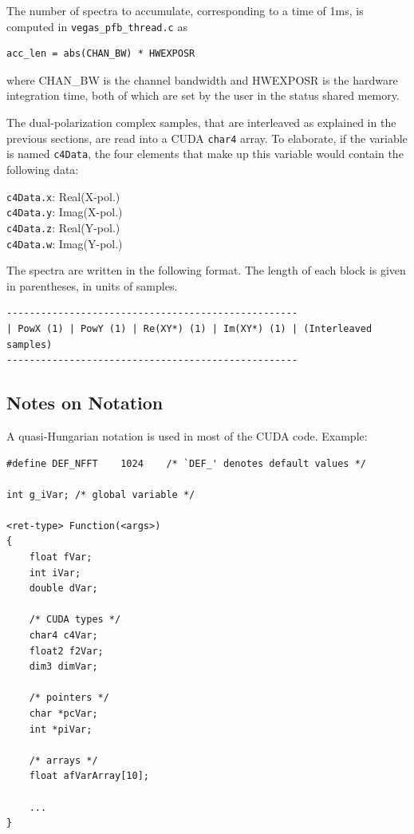 \documentclass[11pt]{article} %
\begin{document}
The number of spectra to accumulate, corresponding to a time of 1ms, is
computed in {\tt vegas\_pfb\_thread.c} as
\begin{verbatim}
acc_len = abs(CHAN_BW) * HWEXPOSR
\end{verbatim}
where CHAN\_BW is the channel bandwidth and HWEXPOSR is the hardware
integration time, both of which are set by the user in the status shared memory.

The dual-polarization complex samples, that are interleaved as explained in the
previous sections, are read into a CUDA {\tt char4} array. To elaborate, if the
variable is named {\tt c4Data}, the four elements that make up this variable
would contain the following data:

\vspace{11pt}

\noindent
{\tt c4Data.x}: Real(X-pol.)\\
{\tt c4Data.y}: Imag(X-pol.)\\
{\tt c4Data.z}: Real(Y-pol.)\\
{\tt c4Data.w}: Imag(Y-pol.)

\vspace{11pt}

The spectra are written in the following format. The length of each block is
given in parentheses, in units of samples.
\begin{verbatim}
---------------------------------------------------
| PowX (1) | PowY (1) | Re(XY*) (1) | Im(XY*) (1) | (Interleaved samples)
---------------------------------------------------
\end{verbatim}


\subsection{Notes on Notation}

A quasi-Hungarian notation is used in most of the CUDA code. Example:

\begin{verbatim}
#define DEF_NFFT    1024    /* `DEF_' denotes default values */

int g_iVar; /* global variable */

<ret-type> Function(<args>)
{
    float fVar;
    int iVar;
    double dVar;

    /* CUDA types */
    char4 c4Var;
    float2 f2Var;
    dim3 dimVar;

    /* pointers */
    char *pcVar;
    int *piVar;

    /* arrays */
    float afVarArray[10];

    ...
}
\end{verbatim}
\end{document}
